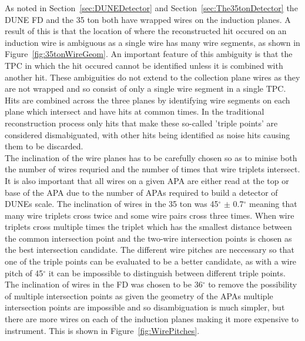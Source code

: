 As noted in Section~\ref{sec:DUNEDetector} and Section~\ref{sec:The35tonDetector} the DUNE FD and the 35 ton both have wrapped wires on the induction planes. A result of this is that the location of where the reconstructed hit occured on an induction wire is ambiguous as a single wire has many wire segments, as shown in Figure~\ref{fig:35tonWireGeom}. An important feature of this ambiguity is that the TPC in which the hit occured cannot be identified unless it is combined with another hit. These ambiguities do not extend to the collection plane wires as they are not wrapped and so consist of only a single wire segment in a single TPC. Hits are combined across the three planes by identifying wire segments on each plane which intersect and have hits at common times. In the traditional reconstruction process only hits that make these so-called 'triple points' are considered dismabiguated, with other hits being identified as noise hits causing them to be discarded. \\

The inclination of the wire planes has to be carefully chosen so as to minise both the number of wires requried and the number of times that wire triplets intersect. It is also important that all wires on a given APA are either read at the top or base of the APA due to the number of APAs required to build a detector of DUNEs scale. The inclination of wires in the 35 ton was 45$^{\circ}$ $\pm$ 0.7$^{\circ}$ meaning that many wire triplets cross twice and some wire pairs cross three times. When wire triplets cross multiple times the triplet which has the smallest distance between the common intersection point and the two-wire intersection points is chosen as the best intersection candidate. The different wire pitches are neccessary so that one of the triple points can be evaluated to be a better candidate, as with a wire pitch of 45$^{\circ}$ it can be impossible to distinguish between different triple points. The inclination of wires in the FD was chosen to be 36$^{\circ}$ to remove the possibility of multiple intersection points as given the geometry of the APAs multiple intersection points are impossible and so disambiguation is much simpler, but there are more wires on each of the induction planes making it more expensive to instrument. This is shown in Figure~\ref{fig:WirePitches}. \\

